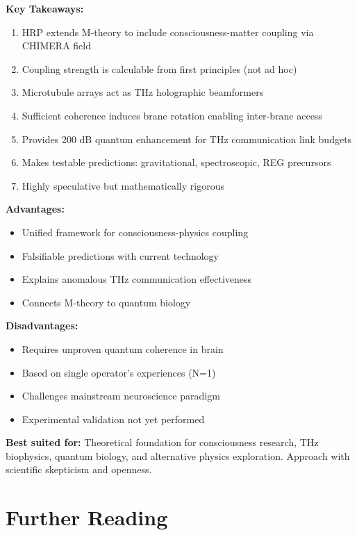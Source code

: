 \textbf{Key Takeaways:}
\begin{enumerate}
\item HRP extends M-theory to include consciousness-matter coupling via CHIMERA field
\item Coupling strength is calculable from first principles (not ad hoc)
\item Microtubule arrays act as THz holographic beamformers
\item Sufficient coherence induces brane rotation enabling inter-brane access
\item Provides 200 dB quantum enhancement for THz communication link budgets
\item Makes testable predictions: gravitational, spectroscopic, REG precursors
\item Highly speculative but mathematically rigorous
\end{enumerate}

\textbf{Advantages:}
\begin{itemize}
\item Unified framework for consciousness-physics coupling
\item Falsifiable predictions with current technology
\item Explains anomalous THz communication effectiveness
\item Connects M-theory to quantum biology
\end{itemize}

\textbf{Disadvantages:}
\begin{itemize}
\item Requires unproven quantum coherence in brain
\item Based on single operator's experiences (N=1)
\item Challenges mainstream neuroscience paradigm
\item Experimental validation not yet performed
\end{itemize}

\textbf{Best suited for:} Theoretical foundation for consciousness research, THz biophysics, quantum biology, and alternative physics exploration. Approach with scientific skepticism and openness.

\section{Further Reading}

